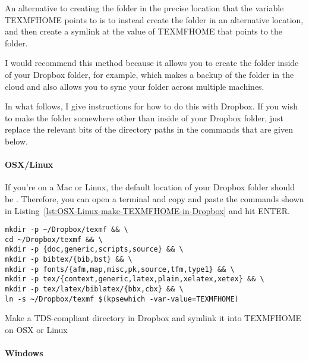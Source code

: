 \label{subsubsubsec:symlink-your-local-texmf-folder-into-TEXMFHOME}

An alternative to creating the  folder in the precise location that the variable TEXMFHOME points to is to instead create the folder in an alternative location, and then create a symlink at the value of TEXMFHOME that points to the  folder.

I would recommend this method because it allows you to create the  folder inside of your Dropbox folder, for example, which makes a backup of the  folder in the cloud and also allows you to sync your  folder across multiple machines.

In what follows, I give instructions for how to do this with Dropbox.
If you wish to make the folder somewhere other than inside of your Dropbox folder, just replace the relevant bits of the directory paths in the commands that are given below.

\paragraph{OSX/Linux}

If you're on a Mac or Linux, the default location of your Dropbox folder should be .
Therefore, you can open a terminal and copy and paste the commands shown in Listing~\ref{lst:OSX-Linux-make-TEXMFHOME-in-Dropbox} and hit ENTER.

\begin{listing}[htbp]
	\centering
	\begin{verbatim}
mkdir -p ~/Dropbox/texmf && \
cd ~/Dropbox/texmf && \
mkdir -p {doc,generic,scripts,source} && \
mkdir -p bibtex/{bib,bst} && \
mkdir -p fonts/{afm,map,misc,pk,source,tfm,type1} && \
mkdir -p tex/{context,generic,latex,plain,xelatex,xetex} && \
mkdir -p tex/latex/biblatex/{bbx,cbx} && \
ln -s ~/Dropbox/texmf $(kpsewhich -var-value=TEXMFHOME)
	\end{verbatim}
	\caption{Make a TDS-compliant directory in Dropbox and symlink it into TEXMFHOME on OSX or Linux}
	\label{lst:OSX-Linux-make-TEXMFHOME-in-Dropbox}
\end{listing}

\paragraph{Windows}

